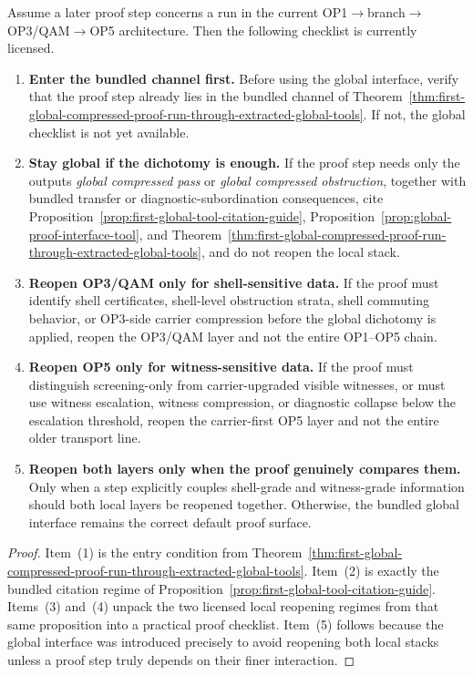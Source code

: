 \begin{proposition}
\label{prop:first-global-usage-checklist}
Assume a later proof step concerns a run in the current OP1$\to$branch$\to$OP3/QAM$\to$OP5 architecture. Then the following checklist is currently licensed.
\begin{enumerate}[leftmargin=2em,label=(\arabic*)]
\item \textbf{Enter the bundled channel first.}
Before using the global interface, verify that the proof step already lies in the bundled channel of Theorem~\ref{thm:first-global-compressed-proof-run-through-extracted-global-tools}. If not, the global checklist is not yet available.
\item \textbf{Stay global if the dichotomy is enough.}
If the proof step needs only the outputs \emph{global compressed pass} or \emph{global compressed obstruction}, together with bundled transfer or diagnostic-subordination consequences, cite Proposition~\ref{prop:first-global-tool-citation-guide}, Proposition~\ref{prop:global-proof-interface-tool}, and Theorem~\ref{thm:first-global-compressed-proof-run-through-extracted-global-tools}, and do not reopen the local stack.
\item \textbf{Reopen OP3/QAM only for shell-sensitive data.}
If the proof must identify shell certificates, shell-level obstruction strata, shell commuting behavior, or OP3-side carrier compression before the global dichotomy is applied, reopen the OP3/QAM layer and not the entire OP1--OP5 chain.
\item \textbf{Reopen OP5 only for witness-sensitive data.}
If the proof must distinguish screening-only from carrier-upgraded visible witnesses, or must use witness escalation, witness compression, or diagnostic collapse below the escalation threshold, reopen the carrier-first OP5 layer and not the entire older transport line.
\item \textbf{Reopen both layers only when the proof genuinely compares them.}
Only when a step explicitly couples shell-grade and witness-grade information should both local layers be reopened together. Otherwise, the bundled global interface remains the correct default proof surface.
\end{enumerate}
\end{proposition}

\begin{proof}
Item~(1) is the entry condition from Theorem~\ref{thm:first-global-compressed-proof-run-through-extracted-global-tools}. Item~(2) is exactly the bundled citation regime of Proposition~\ref{prop:first-global-tool-citation-guide}. Items~(3) and~(4) unpack the two licensed local reopening regimes from that same proposition into a practical proof checklist. Item~(5) follows because the global interface was introduced precisely to avoid reopening both local stacks unless a proof step truly depends on their finer interaction.
\end{proof}

